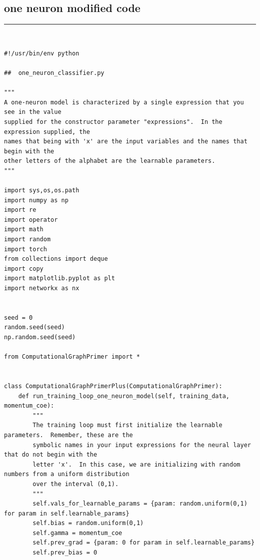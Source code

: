 \documentclass{article}
\begin{document}
\subsection{one neuron modified code}
\textcolor{red}{\rule[-0.3in]{6.1in}{0.03in}}\\
\vspace{-0.05in}
\begin{verbatim}
#!/usr/bin/env python

##  one_neuron_classifier.py

"""
A one-neuron model is characterized by a single expression that you see in the value
supplied for the constructor parameter "expressions".  In the expression supplied, the
names that being with 'x' are the input variables and the names that begin with the
other letters of the alphabet are the learnable parameters.
"""

import sys,os,os.path
import numpy as np
import re
import operator
import math
import random
import torch
from collections import deque
import copy
import matplotlib.pyplot as plt
import networkx as nx


seed = 0
random.seed(seed)
np.random.seed(seed)

from ComputationalGraphPrimer import *


class ComputationalGraphPrimerPlus(ComputationalGraphPrimer):
    def run_training_loop_one_neuron_model(self, training_data, momentum_coe):
        """
        The training loop must first initialize the learnable parameters.  Remember, these are the
        symbolic names in your input expressions for the neural layer that do not begin with the
        letter 'x'.  In this case, we are initializing with random numbers from a uniform distribution
        over the interval (0,1).
        """
        self.vals_for_learnable_params = {param: random.uniform(0,1) for param in self.learnable_params}
        self.bias = random.uniform(0,1)
        self.gamma = momentum_coe
        self.prev_grad = {param: 0 for param in self.learnable_params}
        self.prev_bias = 0
        

\end{verbatim}
\end{document}
